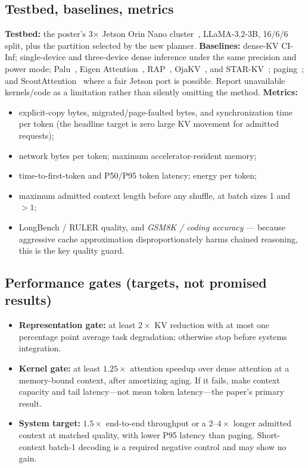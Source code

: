 \documentclass[11pt]{article}
\newcommand{\term}[1]{\textbf{\color{accent!85!black}#1}}
\begin{document}
\subsection{Testbed, baselines, metrics}
\term{Testbed:} the poster's 3$\times$ Jetson Orin Nano cluster~\cite{poster}, LLaMA-3.2-3B,
16/6/6 split, plus the partition selected by the new planner. \term{Baselines:} dense-KV
CI-Inf; single-device and three-device dense inference under the same precision and power mode;
Palu~\cite{palu}, Eigen Attention~\cite{eigenattention}, RAP~\cite{rap}, OjaKV~\cite{ojakv},
and STAR-KV~\cite{starkv}; paging~\cite{pagedattention}; and ScoutAttention~\cite{scoutattention}
where a fair Jetson port is possible. Report unavailable kernels/code as a limitation rather
than silently omitting the method. \term{Metrics:}
\begin{itemize}[leftmargin=1.5em,nosep]
\item explicit-copy bytes, migrated/page-faulted bytes, and synchronization time per token
(the headline target is zero large KV movement for admitted requests);
\item network bytes per token; maximum accelerator-resident memory;
\item time-to-first-token and P50/P95 token latency; energy per token;
\item maximum admitted context length before any shuffle, at batch sizes 1 and $>1$;
\item LongBench / RULER quality, and \emph{GSM8K / coding accuracy} --- because aggressive cache
approximation disproportionately harms chained reasoning, this is the key quality guard.
\end{itemize}

\subsection{Performance gates (targets, not promised results)}
\begin{itemize}[leftmargin=1.5em,itemsep=1pt]
\item \term{Representation gate:} at least $2\times$ KV reduction with at most one
percentage point average task degradation; otherwise stop before systems integration.
\item \term{Kernel gate:} at least $1.25\times$ attention speedup over dense attention
at a memory-bound context, after amortizing aging. If it fails, make context capacity and tail
latency---not mean token latency---the paper's primary result.
\item \term{System target:} $1.5\times$ end-to-end throughput or a $2$--$4\times$ longer
admitted context at matched quality, with lower P95 latency than paging. Short-context batch-1
decoding is a required negative control and may show no gain.
\end{itemize}
\end{document}
